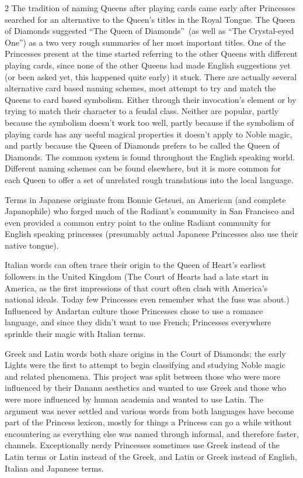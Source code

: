 \begin{multicols}{2}
The tradition of naming Queens after playing cards came early after Princesses searched for an alternative to the Queen's titles in the Royal Tongue. The Queen of Diamonds suggested \textquotedblleft The Queen of Diamonds\textquotedblright\, (as well as \textquotedblleft The Crystal-eyed One\textquotedblright ) as a two very rough summaries of her most important titles. One of the Princesses present at the time started referring to the other Queens with different playing cards, since none of the other Queens had made English suggestions yet (or been asked yet, this happened quite early) it stuck. There are actually several alternative card based naming schemes, most attempt to try and match the Queens to card based symbolism. Either through their invocation's element or by trying to match their character to a feudal class. Neither are popular, partly because the symbolism doesn't work too well, partly because if the symbolism of playing cards has any useful magical properties it doesn't apply to Noble magic, and 
partly because the Queen of Diamonds prefers to be called the Queen of Diamonds. The common system is found throughout the English speaking world. Different naming schemes can be found elsewhere, but it is more common for each Queen to offer a set of unrelated rough translations into the local language. 

Terms in Japanese originate from Bonnie Getsuei, an American (and complete Japanophile) who forged much of the Radiant's community in San Francisco and even provided a common entry point to the online Radiant community for English speaking princesses (presumably actual Japanese Princesses also use their native tongue). 

Italian words can often trace their origin to the Queen of Heart's earliest followers in the United Kingdom (The Court of Hearts had a late start in America, as the first impressions of that court often clash with America's national ideals. Today few Princesses even remember what the fuss was about.) Influenced by Andartan culture those Princesses chose to use a romance language, and since they didn't want to use French; Princesses everywhere sprinkle their magic with Italian terms. 

Greek and Latin words both share origins in the Court of Diamonds; the early Lights were the first to attempt to begin classifying and studying Noble magic and related phenomena. This project was split between those who were more influenced by their Danann aesthetics and wanted to use Greek and those who were more influenced by human academia and wanted to use Latin. The argument was never settled and various words from both languages have become part of the Princess lexicon, mostly for things a Princess can go a while without encountering as everything else was named through informal, and therefore faster, channels. Exceptionally nerdy Princesses sometimes use Greek instead of the Latin terms or Latin instead of the Greek, and Latin or Greek instead of English, Italian and Japanese terms. 


\end{multicols}
